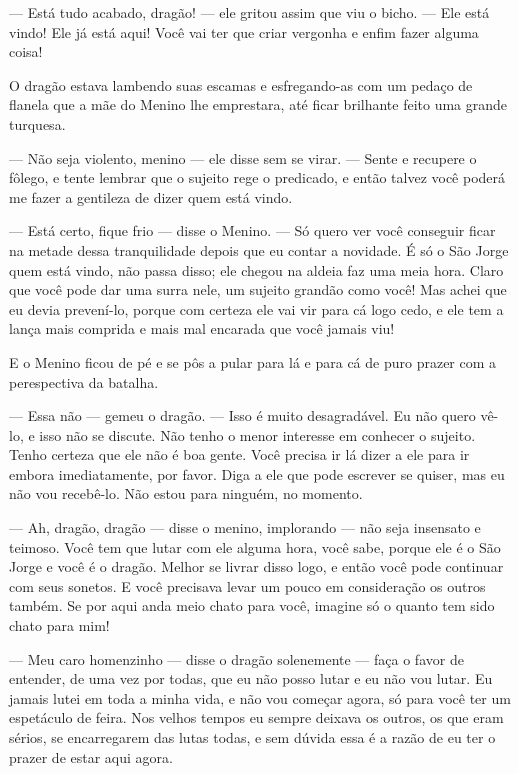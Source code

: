 — Está tudo acabado, dragão! — ele gritou assim que viu o bicho. — Ele
está vindo! Ele já está aqui! Você vai ter que criar vergonha e enfim
fazer alguma coisa!

O dragão estava lambendo suas escamas e esfregando-as com um pedaço de
flanela que a mãe do Menino lhe emprestara, até ficar brilhante feito
uma grande turquesa.

— Não seja violento, menino — ele disse sem se virar. — Sente e
recupere o fôlego, e tente lembrar que o sujeito rege o predicado, e
então talvez você poderá me fazer a gentileza de dizer quem está
vindo.

— Está certo, fique frio — disse o Menino. — Só quero ver você
conseguir ficar na metade dessa tranquilidade depois que eu contar a
novidade. É só o São Jorge quem está vindo, não passa disso; ele
chegou na aldeia faz uma meia hora. Claro que você pode dar uma surra
nele, um sujeito grandão como você! Mas achei que eu devia
prevení-lo, porque com certeza ele vai vir para cá logo cedo, e ele
tem a lança mais comprida e mais mal encarada que você jamais viu!

E o Menino ficou de pé e se pôs a pular para lá e para cá de puro
prazer com a perespectiva da batalha.

— Essa não — gemeu o dragão. — Isso é muito desagradável. Eu não quero
vê-lo, e isso não se discute. Não tenho o menor interesse em conhecer
o sujeito. Tenho certeza que ele não é boa gente. Você precisa ir lá
dizer a ele para ir embora imediatamente, por favor. Diga a ele que
pode escrever se quiser, mas eu não vou recebê-lo. Não estou para
ninguém, no momento. 

— Ah, dragão, dragão — disse o menino, implorando — não seja insensato
e teimoso. Você tem que lutar com ele alguma hora, você sabe, porque
ele é o São Jorge e você é o dragão. Melhor se livrar disso logo, e
então você pode continuar com seus sonetos. E você precisava levar um
pouco em consideração os outros também. Se por aqui anda meio chato
para você, imagine só o quanto tem sido chato para mim!

— Meu caro homenzinho — disse o dragão solenemente — faça o favor de
entender, de uma vez por todas, que eu não posso lutar e eu não vou
lutar. Eu jamais lutei em toda a minha vida, e não vou começar agora,
só para você ter um espetáculo de feira. Nos velhos tempos eu sempre
deixava os outros, os que eram sérios, se encarregarem das lutas
todas, e sem dúvida essa é a razão de eu ter o prazer de estar aqui
agora.

